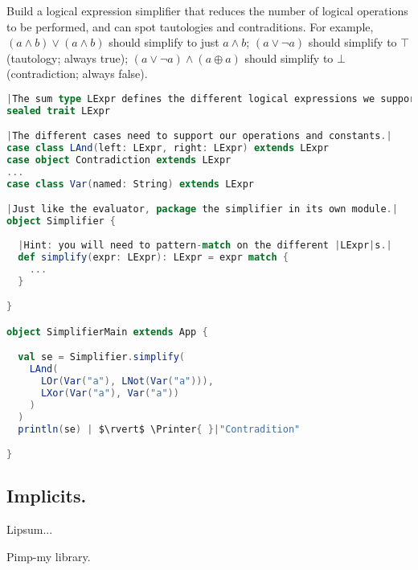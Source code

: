 \documentclass[10 pt]{article}
\begin{document}
\begin{example}
Build a logical expression simplifier that reduces the number of logical operations to be performed, and can spot tautologies and contraditions. For example, $(a \land b) \lor (a \land b)$ should simplify to just $a \land b$; $(a \lor \lnot{a})$ should simplify to $\top$ (tautology; always true); $(a \lor \lnot{a}) \land (a \oplus a)$ should simplify to $\bot$ (contradiction; always false).

\begin{lstlisting}[caption={Logical expression simplifier}, label={code:ls}, language=Scala, escapechar=|]
|The sum type LExpr defines the different logical expressions we support.|
sealed trait LExpr

|The different cases need to support our operations and constants.|
case class LAnd(left: LExpr, right: LExpr) extends LExpr
case object Contradiction extends LExpr
...
case class Var(named: String) extends LExpr

|Just like the evaluator, package the simplifier in its own module.|
object Simplifier {
    
  |Hint: you will need to pattern-match on the different |LExpr|s.|
  def simplify(expr: LExpr): LExpr = expr match {
    ...
  }

}

object SimplifierMain extends App {

  val se = Simplifier.simplify(
    LAnd(
      LOr(Var("a"), LNot(Var("a"))),
      LXor(Var("a"), Var("a"))
    )
  )
  println(se) | $\rvert$ \Printer{ }|"Contradition"

}
\end{lstlisting}

\end{example}
 
\subsection{Implicits.} Lipsum...

Pimp-my library.
\end{document}

